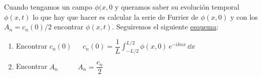 \vspace{5mm} Cuando tengamos un campo $\phi(x,0$ y queramos saber su evolución temporal $\phi(x,t)$ lo que hay que hacer es calcular la serie de Furrier de $\phi(x,0)$ y con los $A_n=c_n(0)/2$ encontrar $\phi(x,t)$. Seguiremos el siguiente \underline{esquema}:

\begin{enumerate}
\item Encontrar $c_n(0)$ \textcolor{gris}{$\quad \displaystyle \ c_n(0)=\dfrac 1 L \int_{-L/2}^{L/2} \phi(x,0)\, e^{-ikn x}\, \dd x$}	
\item Encontrar $A_n$ \textcolor{gris}{$\ \ \qquad A_n  = \dfrac {c_n}2$}
\end{enumerate}

\vspace{5mm}

